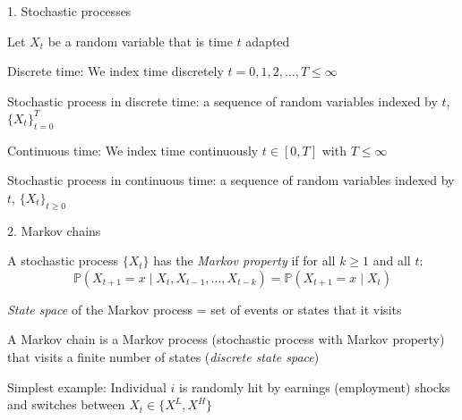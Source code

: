 \documentclass[11pt, aspectratio=169]{beamer}
\newenvironment{witemize}{\itemize\addtolength{\itemsep}{10pt}}{\enditemize}
\begin{document}
\begin{frame}{1. Stochastic processes}
\begin{witemize}
\item Let $X_t$ be a random variable that is time $t$ adapted

\item Discrete time: We index time discretely $t = 0, 1, 2, \ldots, T \leq \infty$

\item Stochastic process in discrete time: a sequence of random variables indexed by $t$, $\{X_t\}_{t=0}^T$

\item Continuous time: We index time continuously $t \in [0, T]$ with $T \leq \infty$

\item Stochastic process in continuous time: a sequence of random variables indexed by $t$, $\{X_t\}_{t \geq 0}$

\end{witemize}
\end{frame}



\begin{frame}{2. Markov chains}
\begin{witemize}
\item A stochastic process $\{X_t\}$ has the \textit{Markov property} if for all $k \geq 1$ and all $t$:
\begin{equation*}
	\mathbb P(X_{t+1} = x \mid X_t, X_{t-1}, \ldots, X_{t-k}) = \mathbb P(X_{t+1} = x \mid X_t)
\end{equation*}

\item \textit{State space} of the Markov process = set of events or states that it visits 

\item A Markov chain is a Markov process (stochastic process with Markov property) that visits a finite number of states (\textit{discrete state space})

\item Simplest example: Individual $i$ is randomly hit by earnings (employment) shocks and switches between $X_t \in \{X^L, X^H\}$
\end{witemize}
\end{frame}
\end{document}
